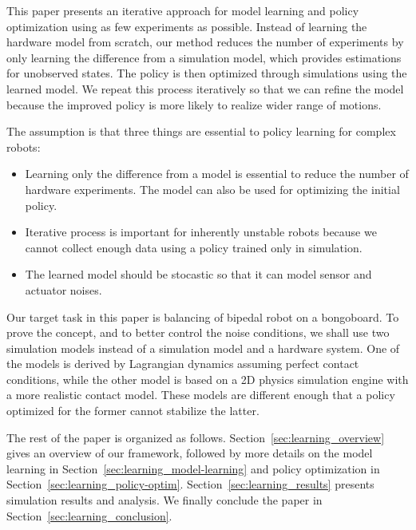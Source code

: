 This paper presents an iterative approach for model learning and
policy optimization using as few experiments as possible.
Instead of learning the hardware model from scratch, our method reduces
the number of experiments by only learning the difference from a
simulation model, which provides estimations for unobserved states.
The policy is then optimized through simulations using the learned
model.
We repeat this process iteratively so that we can refine the model
because the improved policy is more likely to realize wider range of
motions.

The assumption is that three things are essential to policy learning for
complex robots:
\begin{itemize}
\item Learning only the difference from a model is essential to reduce
the number of hardware experiments.  The model can also be used 
	  for optimizing the initial policy.
\item Iterative process is important for inherently unstable robots because
	  we cannot collect enough data using a policy trained only in simulation.
\item The learned model should be stocastic so that it can model
	  sensor and actuator noises.
\end{itemize}

Our target task in this paper is balancing of bipedal robot on a
bongoboard.
To prove the concept, and to better control the noise conditions, we shall use
two simulation models instead of a simulation model and a hardware system.
One of the models is derived by Lagrangian dynamics assuming perfect
contact conditions, while the other model is based on a 2D physics
simulation engine with a more realistic contact model.
These models are different enough that a policy optimized
for the former cannot stabilize the latter.

The rest of the paper is organized as follows.
Section~\ref{sec:learning_overview} gives an overview of our framework, followed
by more details on the model learning in
Section~\ref{sec:learning_model-learning} and policy optimization in
Section~\ref{sec:learning_policy-optim}.
Section~\ref{sec:learning_results} presents simulation results and analysis.
We finally conclude the paper in Section~\ref{sec:learning_conclusion}.


